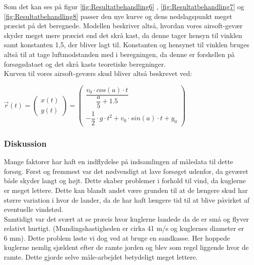 Som det kan ses på figur \ref{fig:Resultatbehandling6} , \ref{fig:Resultatbehandling7} og \ref{fig:Resultatbehandling8} passer den nye kurve og dens nedslagspunkt meget præcist på det beregnede. Modellen beskriver altså, hvordan vores airsoft-gevær skyder meget mere præcist end det skrå kast, da denne tager hensyn til vinklen samt konstanten 1,5, der bliver lagt til. Konstanten og hensynet til vinklen bruges altså til at tage luftmodstanden med i beregningen, da denne er forskellen på forsøgsdataet og det skrå kasts teoretiske beregninger.\\[0.5cm]

Kurven til vores airsoft-geværs skud bliver altså beskrevet ved:\\

\begin{center}
\begin{math}
\overrightarrow{r}(t) = 
\begin{pmatrix}
x(t)\\
y(t)
\end{pmatrix}
=
\begin{pmatrix}
\dfrac{v_{0} \cdot cos(a) \cdot t}{\dfrac{a}{5} + 1.5}\\
- \dfrac{1}{2} \cdot g \cdot t^{2} + v_{0} \cdot sin(a) \cdot t + y_{0}
\end{pmatrix}
\end{math}
\end{center}

\newpage
\subsubsection{Diskussion}

Mange faktorer har haft en indflydelse på indsamlingen af måledata til dette forsøg. Først og fremmest var det nødvendigt at lave forsøget udenfor, da geværet både skyder langt og højt. Dette skaber problemer i forhold til vind, da kuglerne er meget lettere. Dette kan blandt andet være grunden til at de længere skud har større variation i hvor de lander, da de har haft længere tid til at blive påvirket af eventuelle vindstød.\\

Samtidigt var det svært at se præcis hvor kuglerne landede da de er små og flyver relativt hurtigt. (Mundingshastigheden er cirka 41 m/s og kuglernes diameter er 6 mm). Dette problem løste vi dog ved at bruge en sandkasse. Her hoppede kuglerne nemlig sjældent efter de ramte jorden og blev som regel liggende hvor de ramte. Dette gjorde selve måle-arbejdet betydeligt meget lettere.\\

